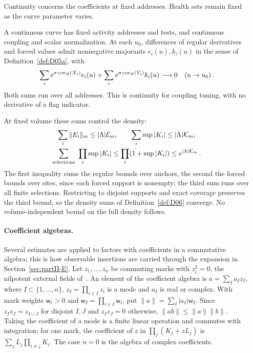 Continuity concerns the coefficients at fixed addresses. Health sets remain fixed as the curve parameter varies.

\begin{definition}\label{def:D25a}
A continuous curve has fixed activity addresses and tests, and continuous coupling and scalar normalization. At each $u_0$, differences of regular derivatives and forced values admit nonnegative majorants $e_i(u),k_i(u)$ in the sense of Definition~\ref{def:D05a}, with
\begin{equation*}
\sum_i e^{\sigma\operatorname{cov}_B(X_i)}e_i(u)
+\sum_i e^{\sigma\operatorname{cov}_B(Y_i)}k_i(u)\longrightarrow0
\quad(u\to u_0)\,.
\end{equation*}
Both sums run over all addresses. This is continuity for coupling tuning, with no derivative of a flag indicator.
\end{definition}

At fixed volume these sums control the density:
\begin{gather*}
\sum_i\|E_i\|_m\le|\Lambda|\mathcal E_m,\qquad
\sum_i\sup|K_i|\le|\Lambda|\mathcal K_m,\\
\sum_{\rm selections}\ \prod_i\sup|K_i|\le\prod_i(1+\sup|K_i|)\le e^{|\Lambda|\mathcal K_m}\,.
\end{gather*}
The first inequality sums the regular bounds over anchors, the second the forced bounds over sites, since each forced support is nonempty; the third sum runs over all finite selections. Restricting to disjoint supports and exact coverage preserves the third bound, so the density sums of Definition~\ref{def:D06} converge. No volume-independent bound on the full density follows.

\paragraph{Coefficient algebras.} Several estimates are applied to factors with coefficients in a commutative algebra; this is how observable insertions are carried through the expansion in Section~\ref{sec:partII-E}. Let $z_1,\ldots,z_n$ be commuting marks with $z_i^2=0$, the nilpotent external fields of~\cite{BauerschmidtBrydgesSlade2019}. An element of the coefficient algebra is $a=\sum_Ia_Iz_I$, where $I\subset\{1,\ldots,n\}$, $z_I=\prod_{i\in I}z_i$ is a mode and $a_I$ is real or complex. With mark weights $\mathsf w_i>0$ and $\mathsf w_I=\prod_{i\in I}\mathsf w_i$, put $\|a\|=\sum_I|a_I|\mathsf w_I$. Since $z_Iz_J=z_{I\cup J}$ for disjoint $I,J$ and $z_Iz_J=0$ otherwise, $\|ab\|\le\|a\|\|b\|$. Taking the coefficient of a mode is a finite linear operation and commutes with integration; for one mark, the coefficient of $z$ in $\prod_j(K_j+zL_j)$ is $\sum_jL_j\prod_{i\ne j}K_i$. The case $n=0$ is the algebra of complex coefficients.

